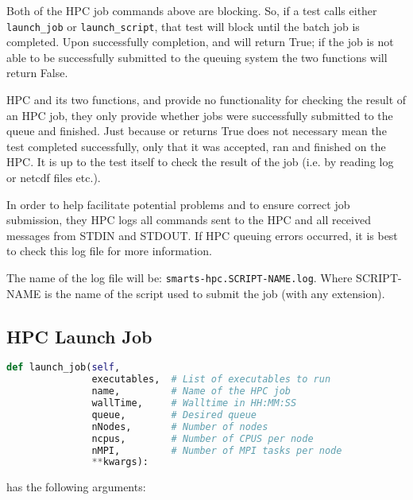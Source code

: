 Both of the HPC job commands above are blocking. So, if a test calls either
{\tt launch\_job} or {\tt launch\_script}, that test will block until the batch
job is completed. Upon successfully completion, \launchscript and \launchjob
will return True; if the job is not able to be successfully submitted to the
queuing system the two functions will return False.

HPC and its two functions, \launchscript and \launchjob provide no
functionality for checking the result of an HPC job, they only provide whether
jobs were successfully submitted to the queue and finished. Just because
\launchscript or \launchjob returns True does not necessary mean the test
completed successfully, only that it was accepted, ran and finished on the HPC.
It is up to the test itself to check the result of the job (i.e. by reading log
or netcdf files etc.).

In order to help facilitate potential problems and to ensure correct job
submission, they HPC logs all commands sent to the HPC and all received
messages from STDIN and STDOUT. If HPC queuing errors occurred, it is best to
check this log file for more information.

The name of the log file will be: {\tt smarts-hpc.SCRIPT-NAME.log}. Where
SCRIPT-NAME is the name of the script used to submit the job (with any
extension).

\subsection{HPC Launch Job}
\label{sec:launchjob}

\begin{lstlisting}[language=Python, 
                   caption={HPC.launch\_job},
                   label={lst:hpc.launch_job},
                   float]
def launch_job(self,
               executables,  # List of executables to run
               name,         # Name of the HPC job
               wallTime,     # Walltime in HH:MM:SS
               queue,        # Desired queue
               nNodes,       # Number of nodes
               ncpus,        # Number of CPUS per node
               nMPI,         # Number of MPI tasks per node
               **kwargs):
\end{lstlisting}

\launchjob has the following arguments:

